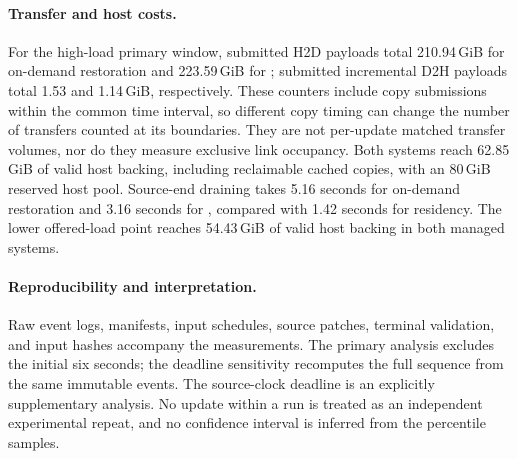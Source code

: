 \documentclass[sigplan,10pt,anonymous,review]{acmart}
\begin{document}
\paragraph{Transfer and host costs.}
For the high-load primary window, submitted H2D payloads total 210.94\,GiB for on-demand restoration and 223.59\,GiB for \systemname; submitted incremental D2H payloads total 1.53 and 1.14\,GiB, respectively.
These counters include copy submissions within the common time interval, so different copy timing can change the number of transfers counted at its boundaries.
They are not per-update matched transfer volumes, nor do they measure exclusive link occupancy.
Both systems reach 62.85\,GiB of valid host backing, including reclaimable cached copies, with an 80\,GiB reserved host pool.
Source-end draining takes 5.16 seconds for on-demand restoration and 3.16 seconds for \systemname, compared with 1.42 seconds for residency.
The lower offered-load point reaches 54.43\,GiB of valid host backing in both managed systems.

\paragraph{Reproducibility and interpretation.}
Raw event logs, manifests, input schedules, source patches, terminal validation, and input hashes accompany the measurements.
The primary analysis excludes the initial six seconds; the deadline sensitivity recomputes the full sequence from the same immutable events.
The source-clock deadline is an explicitly supplementary analysis.
No update within a run is treated as an independent experimental repeat, and no confidence interval is inferred from the percentile samples.



\end{document}
